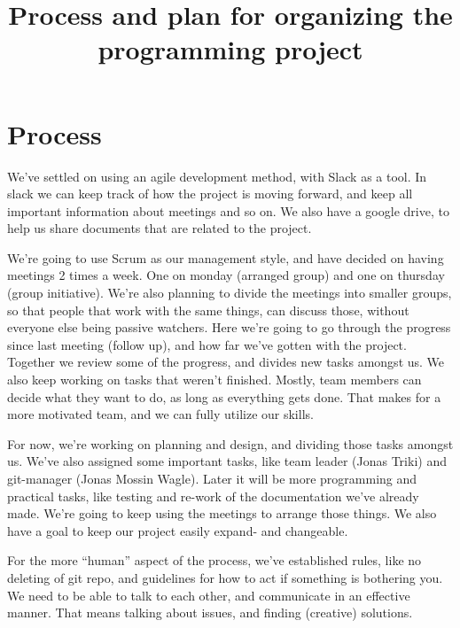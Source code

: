 \documentclass{article}
\title{Process and plan for organizing the programming project}
\date{}
\begin{document}
\maketitle
\section*{Process}
We’ve settled on using an agile development method, with Slack as a tool. In slack we can keep track of how the project is moving forward, and keep all important information about meetings and so on. We also have a google drive, to help us share documents that are related to the project.

We’re going to use Scrum as our management style, and have decided on having meetings 2 times a week. One on monday (arranged group) and one on thursday (group initiative). We’re also planning to divide the meetings into smaller groups, so that people that work with the same things, can discuss those, without everyone else being passive watchers. 
Here we’re going to go through the progress since last meeting (follow up), and how far we’ve gotten with the project. Together we review some of the progress, and divides new tasks amongst us. We also keep working on tasks that weren’t finished. Mostly, team members can decide what they want to do, as long as everything gets done. That makes for a more motivated team, and we can fully utilize our skills.

For now, we’re working on planning and design, and dividing those tasks amongst us. We’ve also assigned some important tasks, like team leader (Jonas Triki) and git-manager (Jonas Mossin Wagle). Later it will be more programming and practical tasks, like testing and re-work of the documentation we’ve already made. We’re going to keep using the meetings to arrange those things. We also have a goal to keep our project easily expand- and changeable.

For the more “human” aspect of the process, we’ve established rules, like no deleting of git repo, and guidelines for how to act if something is bothering you. We need to be able to talk to each other, and communicate in an effective manner. That means talking about issues, and finding (creative) solutions. 
\end{document}
